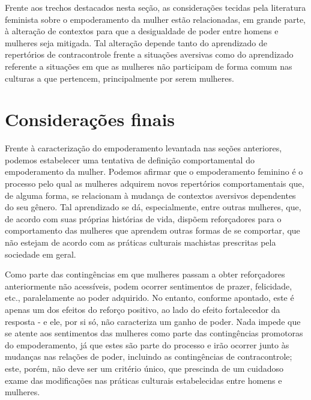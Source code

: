 Frente aos trechos destacados nesta seção, as considerações tecidas pela literatura feminista sobre o empoderamento da mulher estão relacionadas, em grande parte, à alteração de contextos para que a desigualdade de poder entre homens e mulheres seja mitigada. Tal alteração depende tanto do aprendizado de repertórios de contracontrole frente a situações aversivas como do aprendizado referente a situações em que as mulheres não participam de forma comum nas culturas a que pertencem, principalmente por serem mulheres.

\section*{Considerações finais}

Frente à caracterização do empoderamento levantada nas seções anteriores, podemos estabelecer uma tentativa de definição comportamental do empoderamento da mulher. Podemos afirmar que o empoderamento feminino é o processo pelo qual as mulheres adquirem novos repertórios comportamentais que, de alguma forma, se relacionam à mudança de contextos aversivos dependentes do seu gênero. Tal aprendizado se dá, especialmente, entre outras mulheres, que, de acordo com suas próprias histórias de vida, dispõem reforçadores para o comportamento das mulheres que aprendem outras formas de se comportar, que não estejam de acordo com as práticas culturais machistas prescritas pela sociedade em geral.

Como parte das contingências em que mulheres passam a obter reforçadores anteriormente não acessíveis, podem ocorrer sentimentos de prazer, felicidade, etc., paralelamente ao poder adquirido. No entanto, conforme apontado, este é apenas um dos efeitos do reforço positivo, ao lado do efeito fortalecedor da resposta - e ele, por si só, não caracteriza um ganho de poder. Nada impede que se atente aos sentimentos das mulheres como parte das contingências promotoras do empoderamento, já que estes são parte do processo e irão ocorrer junto às mudanças nas relações de poder, incluindo as contingências de contracontrole; este, porém, não deve ser um critério único, que prescinda de um cuidadoso exame das modificações nas práticas culturais estabelecidas entre homens e mulheres.

